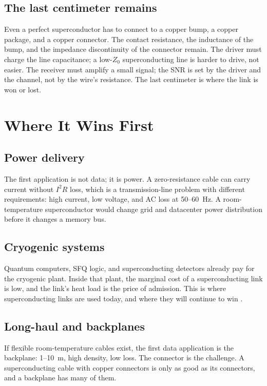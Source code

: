 \documentclass[10pt,letterpaper]{article}
\begin{document}
\subsection{The last centimeter remains}

Even a perfect superconductor has to connect to a copper bump, a copper package, and a copper connector. The contact resistance, the inductance of the bump, and the impedance discontinuity of the connector remain. The driver must charge the line capacitance; a low-$Z_0$ superconducting line is harder to drive, not easier. The receiver must amplify a small signal; the SNR is set by the driver and the channel, not by the wire's resistance. The last centimeter is where the link is won or lost.

\section{Where It Wins First}
\label{sec:wins}

\subsection{Power delivery}

The first application is not data; it is power. A zero-resistance cable can carry current without $I^2R$ loss, which is a transmission-line problem with different requirements: high current, low voltage, and AC loss at 50--60~Hz. A room-temperature superconductor would change grid and datacenter power distribution before it changes a memory bus.

\subsection{Cryogenic systems}

Quantum computers, SFQ logic, and superconducting detectors already pay for the cryogenic plant. Inside that plant, the marginal cost of a superconducting link is low, and the link's heat load is the price of admission. This is where superconducting links are used today, and where they will continue to win \cite{likharev,holmes,monroe}.

\subsection{Long-haul and backplanes}

If flexible room-temperature cables exist, the first data application is the backplane: 1--10~m, high density, low loss. The connector is the challenge. A superconducting cable with copper connectors is only as good as its connectors, and a backplane has many of them.
\end{document}
